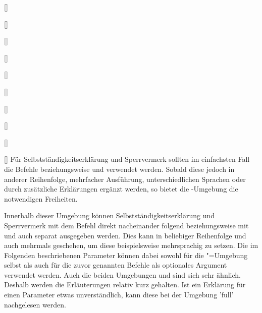 \begin{Declaration}[v2.02]{[\LParameter]}
\begin{Declaration}{[]}
\begin{Declaration}[v2.02]{%
  []%
}
\begin{Declaration}[v2.02]{%
  []%
}
\begin{Declaration}[v2.02]{%
  []%
}
\begin{Declaration}{[\PSet]}
\begin{Declaration}{%
  []
}
\begin{Declaration}{[]}
\begin{Declaration}{[]}
\begin{Declaration}{[]}
\printdeclarationlist%
%
%
Für Selbstständigkeitserklärung und Sperrvermerk sollten im einfachsten Fall 
die Befehle  beziehungsweise  und 
 verwendet werden. Sobald diese jedoch in anderer Reihenfolge,  
mehrfacher Ausführung, unterschiedlichen Sprachen oder durch zusätzliche  
Erklärungen ergänzt werden, so bietet die -Umgebung 
die notwendigen Freiheiten.

Innerhalb dieser Umgebung können Selbstständigkeitserklärung und Sperrvermerk 
mit dem Befehl  direkt nacheinander folgend beziehungsweise 
mit  und  auch separat ausgegeben werden. 
Dies kann in beliebiger Reihenfolge und auch mehrmals geschehen, um diese 
beispielsweise mehrsprachig zu setzen. Die im Folgenden beschriebenen Parameter 
können dabei sowohl für die "=Umgebung selbst als 
auch für die zuvor genannten Befehle als optionales Argument verwendet werden.
Auch die beiden Umgebungen  und  
sind sich sehr ähnlich. Deshalb werden die Erläuterungen relativ kurz gehalten. 
Ist ein Erklärung für einen Parameter etwas unverständlich, kann diese bei der 
Umgebung 'full' nachgelesen werden.


\end{Declaration}
\end{Declaration}
\end{Declaration}
\end{Declaration}
\end{Declaration}
\end{Declaration}
\end{Declaration}
\end{Declaration}
\end{Declaration}
\end{Declaration}
